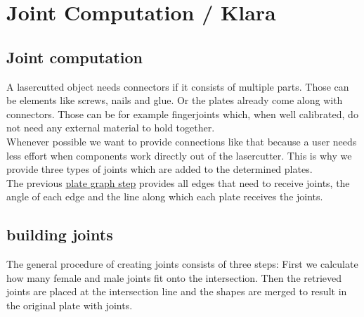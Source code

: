 \documentclass[../ClassicThesis.tex]{subfiles}
\begin{document}
\chapter{Joint Computation / Klara}\label{ch:joints}
\newcommand{\TODO}[1]{\textcolor{red}{\\ \textbf{TODO:} #1 \\}}


\section{Joint computation}
A lasercutted object needs connectors if it consists of multiple parts. Those can be elements like screws, nails and glue. Or the plates already come along with connectors. Those can be for example fingerjoints which, when well calibrated, do not need any external material to hold together. \\
Whenever possible we want to provide connections like that because a user needs less effort when components work directly out of the lasercutter. This is why we provide three types of joints which are added to the determined plates.\\
The previous \hyperref[ch:graph]{plate graph step} provides all edges that need to receive joints, the angle of each edge and the line along which each plate receives the joints.

\section{building joints}
The general procedure of creating joints consists of three steps: First we calculate how many female and male joints fit onto the intersection. Then the retrieved joints are placed at the intersection line and the shapes are merged to result in the original plate with joints.
\end{document}
